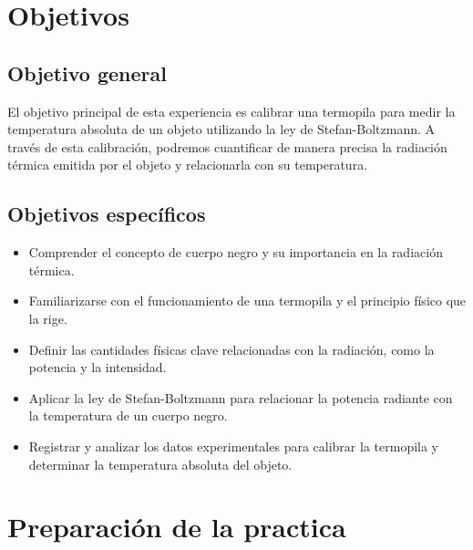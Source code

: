 \documentclass[twocolumn, 12pt]{article}
\begin{document}
\section{Objetivos}

\subsection{Objetivo general}

El objetivo principal de esta experiencia es calibrar una
termopila para medir la temperatura absoluta de un objeto
utilizando la ley de Stefan-Boltzmann. A través de esta
calibración, podremos cuantificar de manera precisa la
radiación térmica emitida por el objeto y relacionarla con
su temperatura.

\subsection{Objetivos específicos}

\begin{itemize}[label=$\triangleright$]
    \item Comprender el concepto de cuerpo negro y su importancia en
          la radiación térmica.

    \item Familiarizarse con el funcionamiento de una termopila y el
          principio físico que la rige.

    \item Definir las cantidades físicas clave relacionadas con la
          radiación, como la potencia y la intensidad.

    \item Aplicar la ley de Stefan-Boltzmann para relacionar la
          potencia radiante con la temperatura de un cuerpo negro.

    \item Registrar y analizar los datos experimentales para calibrar
          la termopila y determinar la temperatura absoluta del
          objeto.
\end{itemize}

\section{Preparación de la practica}

\end{document}
